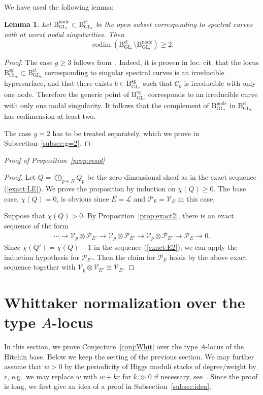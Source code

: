 \documentclass[11pt,oneside,a4paper,mathscr]{amsart}
\newtheorem{lemma}[thm]{Lemma}
\theoremstyle{definition}
\renewcommand{\geq}{\geqslant}
\newcommand{\cC}{\mathcal{C}}
\newcommand{\cP}{\mathcal{P}}
\newcommand{\rB}{\mathrm{B}}
\newcommand{\GL}{\operatorname{GL}}
\begin{document}
We have used the following lemma: 
\begin{lemma}\label{lem:nodeB}
Let $\rB_{\GL_r}^{\mathrm{node}} \subset \rB_{\GL_r}^{\mathrm{cl}}$ be the open subset 
corresponding to spectral curves with at worst nodal singularities. 
Then
\[
\operatorname{codim}(\rB_{\GL_r}^{\mathrm{cl}} \setminus \rB_{\GL_r}^{\mathrm{node}}) \geq 2 .
\]
\end{lemma}

\begin{proof}
The case $g\geq 3$ follows from~\cite[Corollary~1.5 and Remark~1.7]{KouvidakisPantev1995}. 
Indeed, it is proven in loc. cit. that the locus 
$\rB_{\GL_r}^{\mathrm{sg}} \subset \rB_{\GL_r}^{\mathrm{cl}}$ corresponding to singular 
spectral curves is an irreducible hypersurface, and that there exists 
$b\in \rB_{\GL_r}^{\mathrm{sg}}$ such that $\cC_b$ is irreducible with only one node. 
Therefore the generic point of $\rB_{\GL_r}^{\mathrm{sg}}$ corresponds to an 
irreducible curve with only one nodal singularity. 
It follows that the complement of $\rB_{\GL_r}^{\mathrm{node}}$ in 
$\rB_{\GL_r}^{\mathrm{cl}}$ has codimension at least two.

The case $g=2$ has to be treated separately, which we prove in Subsection~\ref{subsec:g=2}.


\end{proof}

\textit{Proof of Proposition~\ref{prop:resol}}
\begin{proof}
Let $Q=\bigoplus_{p\in N}Q_p$ be the zero-dimensional sheaf as in the exact sequence (\ref{exact:LE}). 
We prove the proposition by induction on $\chi(Q)\geq 0$. 
The base case, $\chi(Q)=0$, is obvious since $E=\mathcal{L}$ 
and $\cP_E=\mathcal{V}_{E}$ in this case. 

Suppose that $\chi(Q)>0$. 
    By Proposition~\ref{prop:exact2}, 
    there is an exact sequence of the form 
    \begin{align*}
        \cdots\to \mathcal{V}_{p}\otimes \cP_{E'} \to \mathcal{V}_p\otimes \cP_{E'} \to 
        \mathcal{V}_p\otimes \cP_{E'} \to \cP_E \to 0.
    \end{align*}
    Since $\chi(Q')=\chi(Q)-1$ in the sequence (\ref{exact:E2}), 
    we can apply the induction hypothesis for $\cP_{E'}$. Then the claim 
    for $\cP_E$ holds by the above exact sequence together with 
    $\mathcal{V}_p\otimes \mathcal{V}_{E'}\cong \mathcal{V}_E$. 
\end{proof}


\section[Whittaker normalization over the type A-locus]{Whittaker normalization over the type \texorpdfstring{$A$}{A}-locus}
In this section, we prove Conjecture~\ref{conj:Whit} over the type $A$-locus 
of the Hitchin base. Below we keep the setting of the previous section. 
We may further assume that $w> 0$ by the periodicity 
of Higgs moduli stacks of degree/weight by $r$, e.g.\ we may replace $w$ with $w+kr$ for $k\gg 0$ if necessary, 
see~\cite[Remark~2.14]{TodaGL2}. 
Since the proof is long, 
we first give an idea of a proof in Subsection~\ref{subsec:idea}. 
\end{document}
